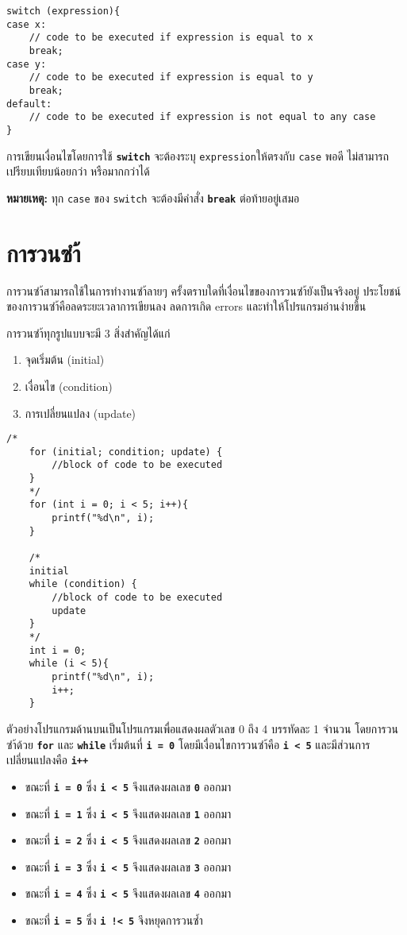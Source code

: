 \begin{lstlisting}
switch (expression){
case x:
	// code to be executed if expression is equal to x
	break;
case y:
	// code to be executed if expression is equal to y
	break;
default:
	// code to be executed if expression is not equal to any case
}
\end{lstlisting}
การเขียนเงื่อนไขโดยการใช้ \textbf{\texttt{switch}} จะต้องระบุ \texttt{expression}ให้ตรงกับ \texttt{case} พอดี ไม่สามารถเปรียบเทียบน้อยกว่า หรือมากกว่าได้

\noindent\textbf{หมายเหตุ:} ทุก \texttt{case} ของ \texttt{switch} จะต้องมีคำสั่ง \textbf{\texttt{break}} ต่อท้ายอยู่เสมอ

\newpage
\section{การวนซำ้}
การวนซำ้สามารถใช้ในการทำงานซำ้ลายๆ ครั้งตราบใดที่เงื่อนไขของการวนซำ้ยังเป็นจริงอยู่ ประโยชน์ของการวนซำ้คือลดระยะเวลาการเขียนลง ลดการเกิด errors และทำให้โปรแกรมอ่านง่ายขึ้น

การวนซำ้ทุกรูปแบบจะมี 3 สิ่งสำคัญได้แก่
\begin{enumerate}
\item จุดเริ่มต้น (initial)
\item เงื่อนไข (condition)
\item การเปลี่ยนแปลง (update)
\end{enumerate}

\begin{lstlisting}
/*
	for (initial; condition; update) {
		//block of code to be executed
	}
	*/
	for (int i = 0; i < 5; i++){
		printf("%d\n", i);
	}

	/*
	initial
	while (condition) {
		//block of code to be executed
		update
	}
	*/
	int i = 0;
	while (i < 5){
		printf("%d\n", i);
		i++;
	}
\end{lstlisting}
ตัวอย่างโปรแกรมด้านบนเป็นโปรแกรมเพื่อแสดงผลตัวเลข 0 ถึง 4 บรรทัดละ 1 จำนวน โดยการวนซำ้ด้วย \textbf{\texttt{for}} และ \textbf{\texttt{while}} เริ่มต้นที่ \textbf{\texttt{i = 0}} โดยมีเงื่อนไขการวนซำ้คือ \textbf{\texttt{i < 5}} และมีส่วนการเปลี่ยนแปลงคือ \textbf{\texttt{i++}}
\begin{itemize}
\item ขณะที่ \textbf{\texttt{i = 0}} ซึ่ง \textbf{\texttt{i < 5}} จึงแสดงผลเลข \textbf{\texttt{0}} ออกมา
\item ขณะที่ \textbf{\texttt{i = 1}} ซึ่ง \textbf{\texttt{i < 5}} จึงแสดงผลเลข \textbf{\texttt{1}} ออกมา
\item ขณะที่ \textbf{\texttt{i = 2}} ซึ่ง \textbf{\texttt{i < 5}} จึงแสดงผลเลข \textbf{\texttt{2}} ออกมา
\item ขณะที่ \textbf{\texttt{i = 3}} ซึ่ง \textbf{\texttt{i < 5}} จึงแสดงผลเลข \textbf{\texttt{3}} ออกมา
\item ขณะที่ \textbf{\texttt{i = 4}} ซึ่ง \textbf{\texttt{i < 5}} จึงแสดงผลเลข \textbf{\texttt{4}} ออกมา
\item ขณะที่ \textbf{\texttt{i = 5}} ซึ่ง \textbf{\texttt{i !< 5}} จึงหยุดการวนซ้ำ
\end{itemize}


